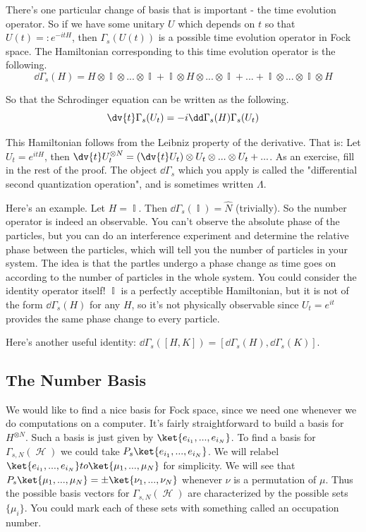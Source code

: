 \documentclass{article}
\DeclareMathOperator{\Hh}{{\mathcal{H}}}
\DeclareMathOperator{\II}{\mathbb{I}}
\begin{document}
There's one particular change of basis that is important - the time evolution operator. So if we have some unitary $U$ which depends on $t$ so that $U(t) =: e^{-itH}$, then $\Gamma_s(U(t))$ is a possible time evolution operator in Fock space. The Hamiltonian corresponding to this time evolution operator is the following.
\[\dd\Gamma_s(H) = H\otimes \II \otimes ... \otimes \II + \II \otimes H \otimes ... \otimes \II +...+ \II \otimes ... \otimes \II \otimes H\]

So that the Schrodinger equation can be written as the following.
\begin{equation}
\dv{t}\Gamma_s(U_t) = -i\dd \Gamma_s(H)\Gamma_s(U_t)
\end{equation}

This Hamiltonian follows from the Leibniz property of the derivative. That is: Let $U_t = e^{itH}$, then $\dv{t} U_t^{\otimes N} =  (\dv{t} U_t) \otimes U_t \otimes ... \otimes U_t + ...$. As an exercise, fill in the rest of the proof. The object $\dd \Gamma_s$ which you apply is called the "differential second quantization operation", and is sometimes written $\Lambda$.

Here's an example. Let $H = \II$. Then $\dd \Gamma_s(\II) = \hat N$ (trivially). So the number operator is indeed an observable. You can't observe the absolute phase of the particles, but you can do an interference experiment and determine the relative phase between the particles, which will tell you the number of particles in your system. The idea is that the partles undergo a phase change as time goes on according to the number of particles in the whole system. You could consider the identity operator itself! $\II$ is a perfectly acceptible Hamiltonian, but it is not of the form $\dd \Gamma_s(H)$ for any $H$, so it's not physically observable since $U_t = e^{it}$ provides the same phase change to every particle.

Here's another useful identity: $\dd \Gamma_s([H,K]) = [\dd\Gamma_s(H),\dd\Gamma_s(K)]$.

\subsection{The Number Basis}
We would like to find a nice basis for Fock space, since we need one whenever we do computations on a computer. It's fairly straightforward to build a basis for $H^{\otimes N}$. Such a basis is just given by $\ket{e_{i_1},...,e_{i_N}}$. To find a basis for $\Gamma_{s,N}(\Hh)$ we could take $P_s\ket{e_{i_1},...,e_{i_N}}$. We will relabel $\ket{e_{i_1},...,e_{i_N}} to \ket{\mu_1,...,\mu_N}$ for simplicity. We will see that $P_s \ket{\mu_1,...,\mu_N} = \pm \ket{\nu_1,...,\nu_N}$ whenever $\nu$ is a permutation of $\mu$. Thus the possible basis vectors for $\Gamma_{s,N}(\Hh)$ are characterized by the possible sets $\{\mu_i\}$. You could mark each of these sets with something called an occupation number. 
\end{document}
